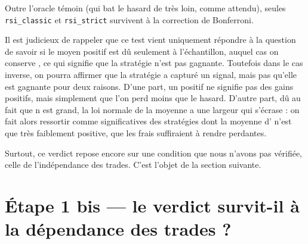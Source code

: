 Outre l'oracle témoin (qui bat le hasard de très loin, comme attendu),
seules \texttt{rsi\_classic} et \texttt{rsi\_strict} survivent à la
correction de Bonferroni.

Il est judicieux de rappeler que ce test vient uniquement répondre à la question de savoir 
si le \edgevar{} moyen positif est dû seulement à l'échantillon, auquel cas on conserve \Hzero{}, ce qui
signifie que la stratégie n'est pas gagnante.
Toutefois dans le cas inverse, on pourra affirmer que la stratégie a capturé un signal,
mais pas qu'elle est gagnante pour deux raisons. 
D'une part, un \edgevar{} positif ne signifie pas des gains positifs, mais simplement que l'on perd moins que le hasard. 
D'autre part, dû au fait que n est grand, la loi normale de la moyenne a une largeur qui s'écrase : 
on fait alors ressortir comme significatives des stratégies dont la moyenne
d'\edgevar{} n'est que très
faiblement positive, que les frais suffiraient à rendre perdantes.

Surtout, ce verdict repose encore sur une condition que nous n'avons pas
vérifiée, celle de l'indépendance des trades. C'est l'objet de la section
suivante.




\section{Étape 1 bis --- le verdict survit-il à la dépendance des trades ?}
\label{sec:b1-dependance}


